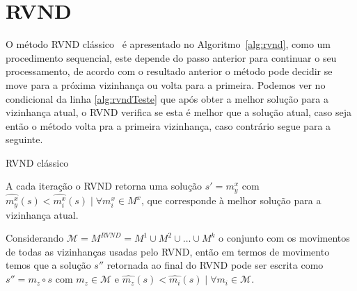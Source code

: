 \section{RVND} \label{sec:rvndClassico}

O método RVND clássico~\cite{souza2010} é apresentado no Algoritmo~\ref{alg:rvnd}, como um procedimento sequencial, este depende do passo anterior para continuar o seu processamento, de acordo com o resultado anterior o método pode decidir se move para a próxima vizinhança ou volta para a primeira.
Podemos ver no condicional da linha \ref{alg:rvndTeste} que após obter a melhor solução para a vizinhança atual, o RVND verifica se esta é melhor que a solução atual, caso seja então o método volta pra a primeira vizinhança, caso contrário segue para a seguinte.

\begin{algorithm}[htpb]
\caption{RVND clássico}
\label{alg:rvnd}
\begin{algorithmic}[1]
         
             
            
             \label{alg:rvndTeste}
            \Else
            \EndIf
        \EndFor
    \EndFunction
\end{algorithmic}
\end{algorithm}

A cada iteração o RVND retorna uma solução $s' = m_y^x$ com $\widehat{m_y^x}(s) < \widehat{m_i^x}(s) \mid \forall m_i^x \in M^x$, que corresponde à melhor solução para a vizinhança atual.

Considerando $ \mathcal{M} = M^{RVND} = M^1 \cup M^2 \cup \dots \cup M^k $ o conjunto com os movimentos de todas as vizinhanças usadas pelo RVND, então em termos de movimento temos que a solução $s''$ retornada ao final do RVND pode ser escrita como $s'' = m_z \circ s$ com $m_z \in \mathcal{M}$ e $\widehat{m_z}(s) < \widehat{m_i}(s) \mid \forall m_i \in \mathcal{M}$.
